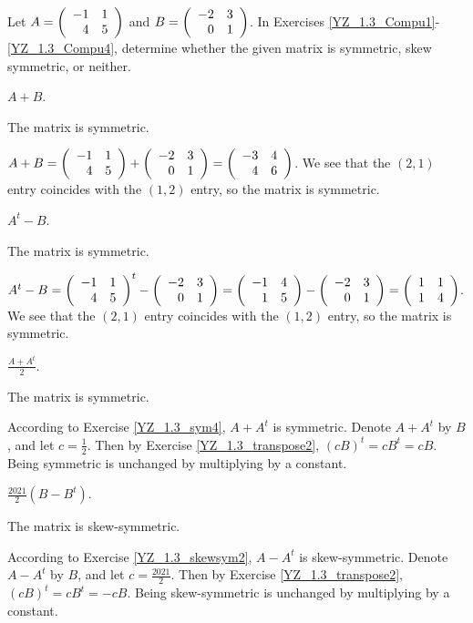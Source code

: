 \documentclass{ximera}
\begin{document}
Let $A=\left(\begin{array}{rrrrrrrrrrrrrrrrrr} -1&1\\4&5 \end{array}\right)$ and $B=\left(\begin{array}{rrrrrrrrrrrrrrrrrr} -2&3\\0&1 \end{array}\right)$. In Exercises \ref{YZ_1.3_Compu1}-\ref{YZ_1.3_Compu4}, determine whether the given matrix is symmetric, skew symmetric, or neither.

\begin{exercise}\label{YZ_1.3_Compu1}
$A+B$.

\begin{solution}
\ans The matrix is symmetric.

\soln
$A+B=\left(\begin{array}{rrrrrrrrrrrrrrrrrr} -1&1\\4&5 \end{array}\right)+\left(\begin{array}{rrrrrrrrrrrrrrrrrr} -2&3\\0&1 \end{array}\right)=\left(\begin{array}{rrrrrrrrrrrrrrrrrr} -3&4\\4&6 \end{array}\right)$. We see that the $(2,1)$ entry coincides with the $(1,2)$ entry, so the matrix is symmetric.
\end{solution}
\end{exercise}

\begin{exercise}\label{YZ_1.3_Compu2}
$A^t-B$.

\begin{solution}
\ans The matrix is symmetric.

\soln
$A^t-B=\left(\begin{array}{rrrrrrrrrrrrrrrrrr} -1&1\\4&5 \end{array}\right)^t-\left(\begin{array}{rrrrrrrrrrrrrrrrrr} -2&3\\0&1 \end{array}\right)=\left(\begin{array}{rrrrrrrrrrrrrrrrrr} -1&4\\1&5 \end{array}\right)-\left(\begin{array}{rrrrrrrrrrrrrrrrrr} -2&3\\0&1 \end{array}\right)=\left(\begin{array}{rrrrrrrrrrrrrrrrrr} 1&1\\1&4 \end{array}\right)$. We see that the $(2,1)$ entry coincides with the $(1,2)$ entry, so the matrix is symmetric.
\end{solution}
\end{exercise}

\begin{exercise}\label{YZ_1.3_Compu3}
$\frac{A+A^t}{2}$.

\begin{solution}
\ans The matrix is symmetric.

\soln According to Exercise \ref{YZ_1.3_sym4}, $A+A^t$ is symmetric. Denote $A+A^t$ by $B$, and let $c=\frac12$. Then by Exercise \ref{YZ_1.3_transpose2}, $(cB)^t=cB^t=cB$. Being symmetric is unchanged by multiplying by a constant.
\end{solution}
\end{exercise}

\begin{exercise}\label{YZ_1.3_Compu4}
$\frac{2021}{2}(B-B^t)$.

\begin{solution}
\ans The matrix is skew-symmetric.

\soln According to Exercise \ref{YZ_1.3_skewsym2}, $A-A^t$ is skew-symmetric. Denote $A-A^t$ by $B$, and let $c=\frac{2021}{2}$. Then by Exercise \ref{YZ_1.3_transpose2}, $(cB)^t=cB^t=-cB$. Being skew-symmetric is unchanged by multiplying by a constant.

\end{solution}
\end{exercise}
\end{document}
